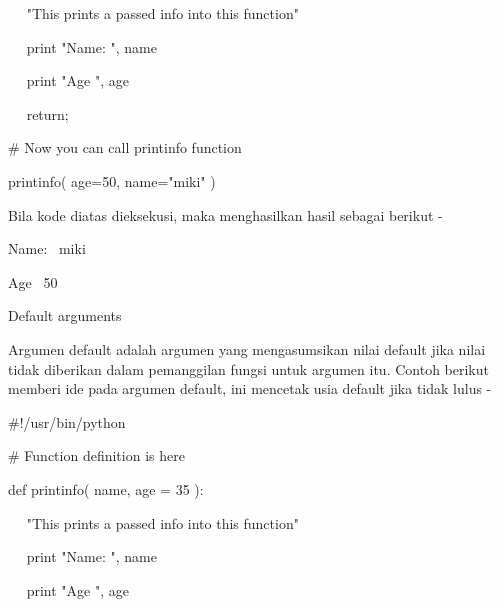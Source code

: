 \noindent 
 \hspace*{0.5in} ~~ "This prints a passed info into this function" \par
\noindent 
 \hspace*{0.5in} ~~ print "Name: ", name \par
\noindent 
 \hspace*{0.5in} ~~ print "Age ", age \par
\noindent 
 \hspace*{0.5in} ~~ return; \par
\vspace{12pt}
\noindent 
 \hspace*{0.5in}  $  \#  $ Now you can call printinfo function \par
\noindent 
 \hspace*{0.5in} printinfo( age=50, name="miki" ) \par
\noindent 
Bila kode diatas dieksekusi, maka menghasilkan hasil sebagai berikut - \par
\noindent 
 \hspace*{0.5in} Name:~ miki \par
\noindent 
 \hspace*{0.5in} Age~ 50 \par
\vspace{12pt}
\noindent 
Default arguments \par
\noindent 
Argumen default adalah argumen yang mengasumsikan nilai default jika nilai tidak diberikan dalam pemanggilan fungsi untuk argumen itu. Contoh berikut memberi ide pada argumen default, ini mencetak usia default jika tidak lulus - \par
\noindent 
 \hspace*{0.5in}  $  \#  $!/usr/bin/python \par
\vspace{12pt}
\noindent 
 \hspace*{0.5in}  $  \#  $ Function definition is here \par
\noindent 
 \hspace*{0.5in} def printinfo( name, age = 35 ): \par
\noindent 
 \hspace*{0.5in} ~~ "This prints a passed info into this function" \par
\noindent 
 \hspace*{0.5in} ~~ print "Name: ", name \par
\noindent 
 \hspace*{0.5in} ~~ print "Age ", age \par
